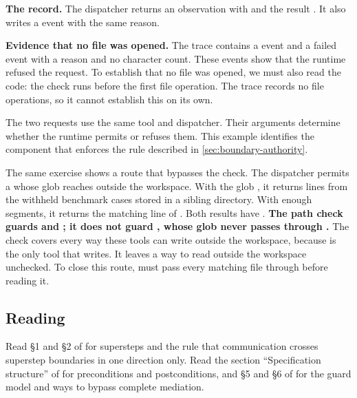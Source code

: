 \item \textbf{The record.} The dispatcher returns an observation with  and the result
.
It also writes a  event with the same reason.

\item \textbf{Evidence that no file was opened.} The trace contains a  event
and a failed  event with a reason and no character count. These events show
that the runtime refused the request. To establish that no file was opened, we must also read the
code: the check runs before the first file operation. The trace records no file operations, so
it cannot establish this on its own.

\ei

The two requests use the same tool and dispatcher. Their arguments determine whether the runtime
permits or refuses them. This example identifies the component that enforces the rule described in
\cref{sec:boundary-authority}.

The same exercise shows a route that bypasses the check. The dispatcher permits a
 whose glob reaches outside the workspace. With the glob
, it returns lines from the withheld benchmark cases stored
in a sibling directory. With enough  segments, it returns the matching line
of . Both results have .
\textbf{The path check guards  and ; it does not guard
, whose glob never passes through .} The check covers
every way these tools can write outside the workspace, because  is the only tool
that writes. It leaves a way to read outside the workspace unchecked. To close this route,
 must pass every matching file through  before reading it.

\subsection{Reading}

Read \S1 and \S2 of \citet{malewicz2010pregel} for supersteps and the rule that communication
crosses superstep boundaries in one direction only. Read the section ``Specification
structure'' of \citet{mit6031-specs} for preconditions and postconditions, and \S5 and \S6 of
\citet{mit6033-lec20} for the guard model and ways to bypass complete mediation.

